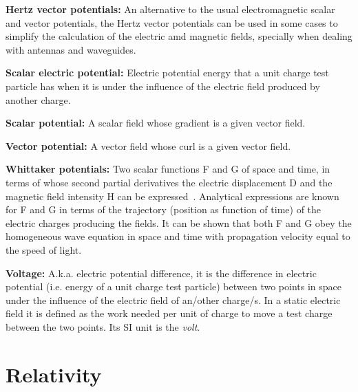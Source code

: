 \begin{list}{}{}
\begin{list}{}{}
		\item \textbf{Hertz vector potentials:} An alternative to the usual electromagnetic scalar and vector potentials, the Hertz vector potentials can be used in some cases to simplify the calculation of the electric amd magnetic fields, specially when dealing with antennas and waveguides.
		
		\item \textbf{Scalar electric potential:} Electric potential energy that a unit charge test particle has when it is under the influence of the electric field produced by another charge.
		
		\item \textbf{Scalar potential:} A scalar field whose gradient is a given vector field.
		
		\item \textbf{Vector potential:} A vector field whose curl is a given vector field.
		
		\item \textbf{Whittaker potentials:} Two scalar functions F and G of space and time, in terms of whose second partial derivatives the electric displacement D and the magnetic field intensity H can be expressed~\cite{Whittaker}. Analytical expressions are known for F and G in terms of the trajectory (position as function of time) of the electric charges producing the fields. It can be shown that both F and G obey the homogeneous wave equation in space and time with propagation velocity equal to the speed of light.
	\end{list}
	
	
	\item \textbf{Voltage:} A.k.a. electric potential difference, it is the difference in electric potential (i.e. energy of a unit charge test particle) between two points in space under the influence of the electric field of an/other charge/s. In a static electric field it is defined as the work needed per unit of charge to move a test charge between the two points. Its SI unit is the \emph{volt}.
\end{list}


\section{Relativity}

